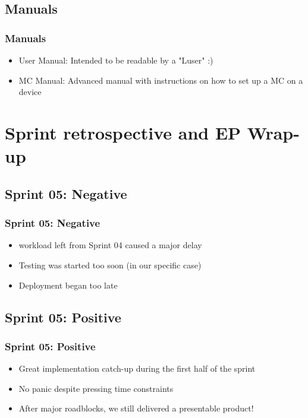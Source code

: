\documentclass[aspectratio=1610,20pt,utf8]{beamer}
\begin{document}

\subsection{Manuals}
\begin{frame}
\frametitle{Manuals}
\begin{itemize}
\item User Manual: Intended to be readable by a "Luser" :) 
\item MC Manual: Advanced manual with instructions on how to set up a MC on a device
\end{itemize}
\end{frame}

\section{Sprint retrospective and EP Wrap-up}
\subsection{Sprint 05: Negative}
\begin{frame}
\frametitle{Sprint 05: Negative}
\begin{itemize}
\item workload left from Sprint 04 caused a major delay
\item Testing was started too soon (in our specific case)
\item Deployment began too late
\end{itemize}
\end{frame}


\subsection{Sprint 05: Positive}
\begin{frame}
\frametitle{Sprint 05: Positive}
\begin{itemize} 
	\item Great implementation catch-up during the first half of the sprint
	\item No panic despite pressing time constraints
	\item After major roadblocks, we still delivered a presentable product!
	\end{itemize}
\end{frame}
\end{document}
